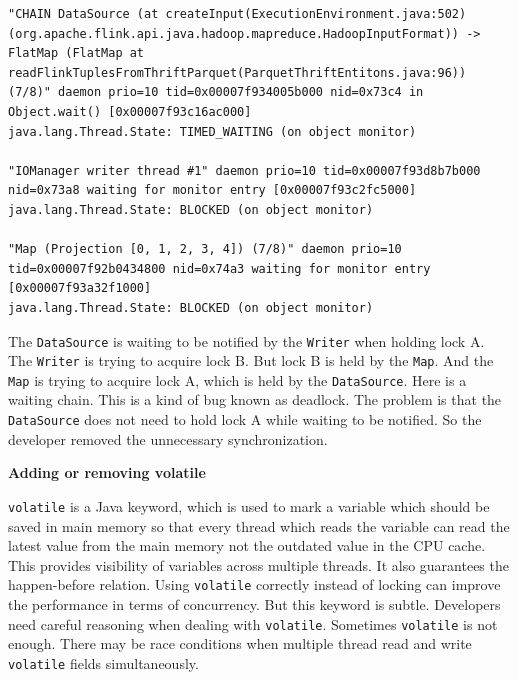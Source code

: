 \documentclass[conference]{IEEEtran}
\begin{document}
\begin{lstlisting}
"CHAIN DataSource (at createInput(ExecutionEnvironment.java:502) (org.apache.flink.api.java.hadoop.mapreduce.HadoopInputFormat)) -> FlatMap (FlatMap at readFlinkTuplesFromThriftParquet(ParquetThriftEntitons.java:96)) (7/8)" daemon prio=10 tid=0x00007f934005b000 nid=0x73c4 in Object.wait() [0x00007f93c16ac000]
java.lang.Thread.State: TIMED_WAITING (on object monitor)

"IOManager writer thread #1" daemon prio=10 tid=0x00007f93d8b7b000 nid=0x73a8 waiting for monitor entry [0x00007f93c2fc5000]
java.lang.Thread.State: BLOCKED (on object monitor)

"Map (Projection [0, 1, 2, 3, 4]) (7/8)" daemon prio=10 tid=0x00007f92b0434800 nid=0x74a3 waiting for monitor entry [0x00007f93a32f1000]
java.lang.Thread.State: BLOCKED (on object monitor)
\end{lstlisting}

The \texttt{DataSource} is waiting to be notified by the \texttt{Writer} when holding lock A. The \texttt{Writer} is trying to acquire lock B. But lock B is held by the \texttt{Map}. And the \texttt{Map} is trying to acquire lock A, which is held by the \texttt{DataSource}. Here is a waiting chain. This is a kind of bug known as deadlock. The problem is that the \texttt{DataSource} does not need to hold lock A while waiting to be notified. So the developer removed the unnecessary synchronization.

\textbf{Adding or removing volatile}

\texttt{volatile} is a Java keyword, which is used to mark a variable which should be saved in main memory so that every thread which reads the variable can read the latest value from the main memory not the outdated value in the CPU cache. This provides visibility of variables across multiple threads. It also guarantees the happen-before relation. Using \texttt{volatile} correctly instead of locking can improve the performance in terms of concurrency. But this keyword is subtle. Developers need careful reasoning when dealing with \texttt{volatile}. Sometimes \texttt{volatile} is not enough. There may be race conditions when multiple thread read and write \texttt{volatile} fields simultaneously.
\end{document}
